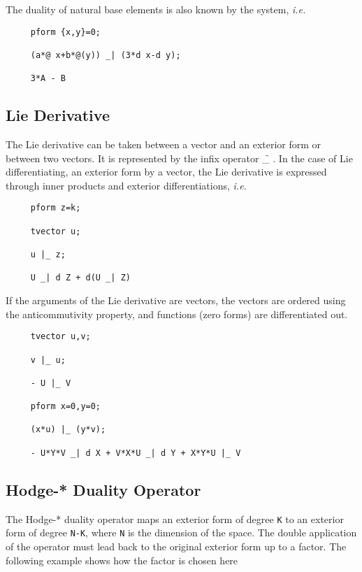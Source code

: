 The duality of natural base elements is also known by the system, \emph{i.e.}

\begin{verbatim}
     pform {x,y}=0;

     (a*@ x+b*@(y)) _| (3*d x-d y);

     3*A - B
\end{verbatim}

\subsection{Lie Derivative}

The Lie derivative can be taken between a vector and an exterior form
or between two vectors.  It is represented by the infix operator \f{\textbar\_}
\label{lie}.  In the case of Lie differentiating, an exterior form by
a vector, the Lie derivative is expressed through inner products and
exterior differentiations, \emph{i.e.}
\hypertarget{reserved:liederivativeop}{}
\begin{verbatim}
     pform z=k;

     tvector u;

     u |_ z;

     U _| d Z + d(U _| Z)
\end{verbatim}

If the arguments of the Lie derivative are vectors, the vectors are
ordered using the anticommutivity property, and functions (zero forms)
are differentiated out.

\example{}

\begin{verbatim}
     tvector u,v;

     v |_ u;

     - U |_ V

     pform x=0,y=0;

     (x*u) |_ (y*v);

     - U*Y*V _| d X + V*X*U _| d Y + X*Y*U |_ V
\end{verbatim}

\subsection{Hodge-* Duality Operator}

 
\hypertarget{reserved:hodegestareop}{}
The Hodge-*\label{hodge} duality operator maps an exterior form of degree
\texttt{K} to an exterior form of degree \texttt{N-K}, where \texttt{N} is the
dimension of the space.  The double application of the operator must
lead back to the original exterior form up to a factor. The following
example shows how the factor is chosen here

